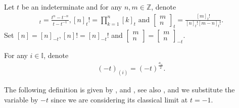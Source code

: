 \documentclass[12pt]{amsart}
\theoremstyle{definition}
\numberwithin{equation}{section}
\begin{document}
Let $ t $ be an indeterminate and for any $ n,m \in \mathbb{Z} $, denote
\begin{align*}
    [n]_{t} = \frac{t^{n}-t^{-n}}{t-t^{-1}}, [n]_t! = \prod_{k=1}^n [k]_t \text{ and } \begin{bmatrix}
        m \\ n
    \end{bmatrix}_{t} = \frac{[m]_t!}{[n]_t![m-n]_t!}.
\end{align*}
Set $  [n] = [n]_{-t} , [n]! = [n]_{-t}!   $ and $ \begin{bmatrix}
        m \\ n
    \end{bmatrix} =\begin{bmatrix}
        m \\ n
    \end{bmatrix}_{-t} $.

For any $ i \in \mathbb{I} $, denote $  $
\begin{align*}
    (-t)_{(i)} = (-t)^{\frac{a_{ii}}{2}}.
\end{align*}



The following definition is given by \cite[Definition 2.8]{Bozec15}, \cite[Definition 3.7]{Bozec16} and \cite[Definition 2.2, Lemma A.1]{FKKB21}, see also \cite[Definition 3.1]{L23}, and we substitute the variable by $ -t $ since we are considering its classical limit at $ t=-1 $.  
\end{document}
